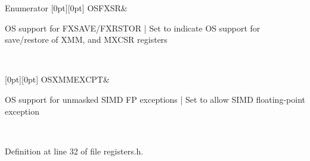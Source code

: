 \begin{DoxyEnumFields}{Enumerator}
[0pt][0pt]{}\mbox{\label{namespace_c_r4_aafe95739cfe1ff98b6250e2af6613758ab0cf978bb5b8c32070363ab81d327c53}} 
O\+S\+F\+X\+SR&
\begin{DoxyPre}OS support for FXSAVE/FXRSTOR              | Set to indicate OS support for save/restore of XMM, and MXCSR registers \end{DoxyPre}
 \\
\hline

[0pt][0pt]{}\mbox{\label{namespace_c_r4_aafe95739cfe1ff98b6250e2af6613758abb68ec0930317011b84484346947f472}} 
O\+S\+X\+M\+M\+E\+X\+C\+PT&
\begin{DoxyPre}OS support for unmasked SIMD FP exceptions | Set to allow SIMD floating-point exception \end{DoxyPre}
 \\
\hline

\end{DoxyEnumFields}


Definition at line 32 of file registers.\+h.

